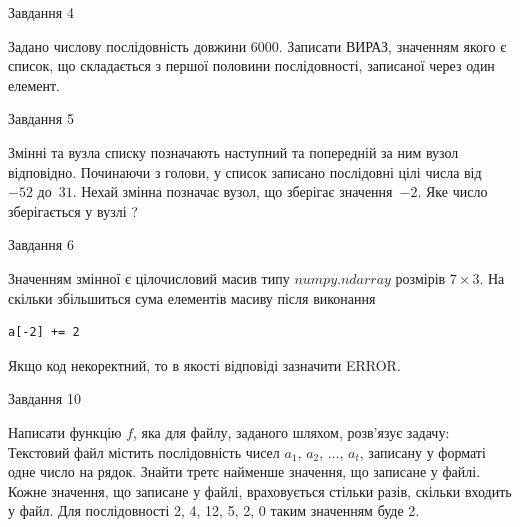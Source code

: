 \documentclass[12pt, ukrainian]{article}
\begin{document}
{\begin{minipage}[t]{8.0cm}
\begin{verbatim}
\end{verbatim}            

\end{minipage}


               
{\begin{center}Завдання {4}\end{center}}
\vspace{-4mm}

 Задано числову послідовність  довжини 6000. Записати ВИРАЗ, значенням якого є список, що складається з першої половини послідовності, записаної через один елемент.\par

\vspace{10mm}
               
{\begin{center}Завдання {5}\end{center}}
\vspace{-4mm}
Змінні  та  вузла списку позначають наступний та попередній за ним вузол відповідно. Починаючи з голови, у список записано послідовні цілі числа від~$-52$ до~$31$. Нехай змінна  позначає вузол, що зберігає значення~$-2$.
Яке число зберігається у вузлі  ?\par

               
{\begin{center}Завдання {6}\end{center}}
\vspace{-4mm}
Значенням змінної  є цілочисловий масив типу $numpy.ndarray$ розмірів $7{\times}3$. На скільки збільшиться сума елементів масиву  після виконання
\begin{verbatim}
a[-2] += 2
\end{verbatim}


Якщо код некоректний, то в якості відповіді зазначити ERROR.\par

               
{\begin{center}Завдання {10}\end{center}}
\vspace{-4mm}

Написати функцію $f$, яка для файлу, заданого шляхом, розв’язує задачу:\\ Текстовий файл містить послідовність чисел $a_1$, $a_2$, $\ldots$, $a_t$, записану у форматі одне число на рядок. Знайти третє найменше значення, що записане у файлі. Кожне значення, що записане у файлі, враховується стільки разів, скільки входить у файл. Для послідовності 2, 4, 12, 5, 2, 0 таким значенням буде 2.

}
\end{document}

